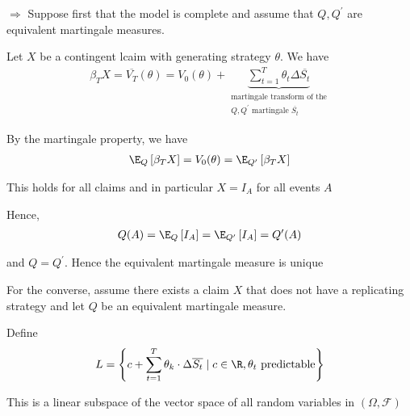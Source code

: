 \begin{prf}{}
  $\Rightarrow$
  Suppose first that the model is complete and assume that $Q,Q^{\prime}$ are equivalent martingale measures.\par
  \noindent Let $X$ be a contingent lcaim with generating strategy $\theta$. We have
  \begin{equation*}
    \begin{gathered}
      \beta_TX = \overline{V_T}(\theta) = V_0(\theta) + \underbrace{\sum_{t=1}^{T}\theta_t\Delta\overline{S_t}}_{\substack{\text{martingale transform of the}\\Q,Q^{\prime}\text{ martingale } \overline{S_t}}}
    \end{gathered}
  \end{equation*}
  \par\bigskip
  \noindent By the martingale property, we have
  \begin{equation*}
    \begin{gathered}
      \E_Q\left[\beta_TX\right] = V_0(\theta) = \E_{Q^{\prime}}\left[\beta_TX\right]
    \end{gathered}
  \end{equation*}
  \par\bigskip
  \noindent This holds for all claims and in particular $X = I_A$ for all events $A$\par
  \noindent Hence, 
  \begin{equation*}
    \begin{gathered}
      Q(A) = \E_Q\left[I_A\right] = \E_{Q^{\prime}}\left[I_A\right] = Q^{\prime}(A)
    \end{gathered}
  \end{equation*}\par
  \noindent and $Q = Q^{\prime}$. Hence the equivalent martingale measure is unique
  \par\bigskip
  \noindent For the converse, assume there exists a claim $X$ that does not have a replicating strategy and let $Q$ be an equivalent martingale measure.\par
  \noindent Define
  \begin{equation*}
    \begin{gathered}
      L = \left\{c+\sum_{t=1}^{T}\theta_k\cdot\Delta\overline{S_t}\mid c\in\R,\theta_t\text{ predictable}\right\}
    \end{gathered}
  \end{equation*}
  \par\bigskip
  \noindent This is a linear subspace of the vector space of all random variables in $(\Omega,\mathcal{F})$\par

\end{prf}
